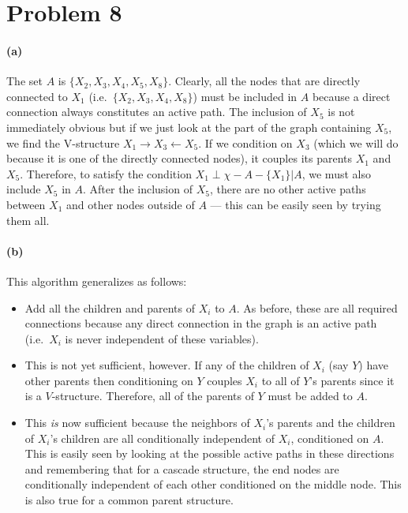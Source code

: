 \documentclass[11pt]{article}
\begin{document}
\section{Problem 8}

\paragraph{(a)}

The set $A$ is $\{ X_2, X_3, X_4, X_5, X_8 \}$. Clearly, all the nodes
that are directly connected to $X_1$ (i.e.~$\{ X_2, X_3, X_4, X_8 \}$) must
be included in $A$ because a direct connection always constitutes an active
path. The inclusion of $X_5$ is not immediately obvious but if we just look
at the part of the graph containing $X_5$, we find the V-structure
$X_1 \to X_3 \gets X_5$. If we condition on $X_3$ (which we will do because
it is one of the directly connected nodes), it couples its parents $X_1$
and $X_5$.  Therefore, to satisfy the condition $X_1 \perp \chi-A-\{X_1\}|A$,
we must also include $X_5$ in $A$.  After the inclusion of $X_5$, there are
no other active paths between $X_1$ and other nodes outside of $A$ --- this
can be easily seen by trying them all.

\paragraph{(b)}

This algorithm generalizes as follows:
\begin{itemize}
    \item{Add all the children and parents of $X_i$ to $A$. As before,
        these are all required connections because any direct connection
        in the graph is an active path (i.e.~$X_i$ is never independent
        of these variables).}
    \item{This is not yet sufficient, however. If any of the children of
        $X_i$ (say $Y$) have other parents then conditioning on $Y$ couples
        $X_i$ to all of $Y$'s parents since it is a $V$-structure.
        Therefore, all of the parents of $Y$ must be added to $A$.}
    \item{This \emph{is} now sufficient because the neighbors of $X_i$'s
        parents and the children of $X_i$'s children are all
        conditionally independent of $X_i$, conditioned on $A$. This is
        easily seen by looking at the possible active paths in these
        directions and remembering that for a cascade structure, the
        end nodes are conditionally independent of each other conditioned
        on the middle node. This is also true for a common parent structure.}
\end{itemize}
\end{document}

